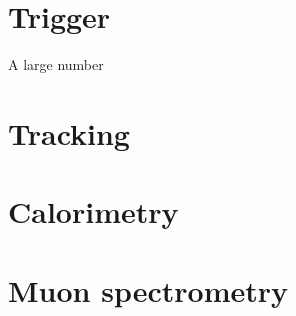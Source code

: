 \section{Trigger}

A large number 

\section{Tracking}

\section{Calorimetry}

\section{Muon spectrometry}

